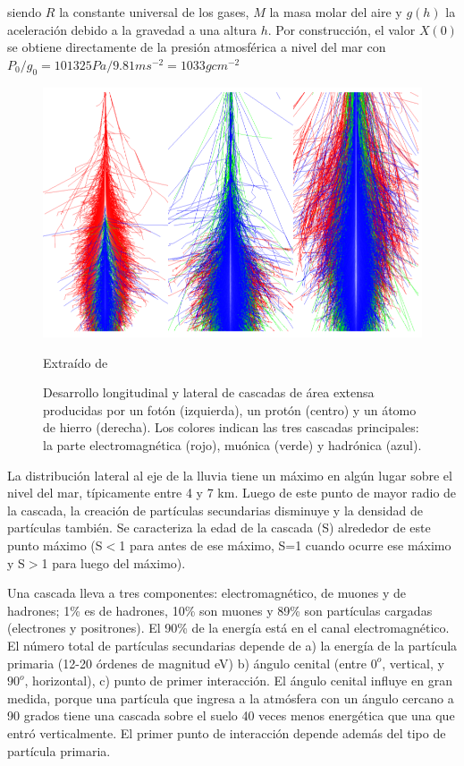 \documentclass{book}
\begin{document}
siendo $R$ la constante universal de los gases, $M$ la masa molar del aire y $g(h)$ la aceleraci\'on debido a la gravedad a una altura $h$. Por construcci\'on, el valor $X(0)$ se obtiene directamente de la presi\'on atmosf\'erica a nivel del mar con $P_0/g_0=101325Pa/9.81ms^{-2}=1033gcm^{-2}$ \citep{YUNIOR}

\begin{figure}[ht] %
\begin{center}
 \includegraphics[width = 0.7\linewidth]{Cascadas.png}
 
 Extra\'ido de \citep{ASOREY}
\caption{Desarrollo longitudinal y lateral de cascadas de \'area extensa producidas por un fot\'on (izquierda), un prot\'on (centro) y un \'atomo de hierro (derecha). Los colores indican las tres cascadas principales: la parte electromagn\'etica (rojo), mu\'onica (verde) y hadr\'onica (azul).}
\end{center}
\end{figure}

La distribuci\'on lateral al eje de la lluvia tiene un m\'aximo en alg\'un lugar sobre el nivel del mar, t\'ipicamente entre 4 y 7 km. Luego de este punto de mayor radio de la cascada, la creaci\'on de part\'iculas secundarias disminuye y la densidad de part\'iculas tambi\'en. Se caracteriza la edad de la cascada (S) alrededor de este punto m\'aximo (S$<$1 para antes de ese m\'aximo, S=1 cuando ocurre ese m\'aximo y S$>$1 para luego del m\'aximo). \citep{ASOREY}\citep{SUAREZ}

Una cascada lleva a tres componentes: electromagn\'etico, de muones y de hadrones; 1\% es de hadrones, 10\% son muones y 89\% son part\'iculas cargadas (electrones y positrones). El 90\% de la energ\'ia est\'a en el canal electromagn\'etico. El n\'umero total de part\'iculas secundarias depende de a) la energ\'ia de la part\'icula primaria (12-20 \'ordenes de magnitud eV) b) \'angulo cenital (entre $0^o$, vertical, y $90^o$, horizontal), c) punto de primer interacci\'on. El \'angulo cenital influye en gran medida, porque una part\'icula que ingresa a la atm\'osfera con un \'angulo cercano a 90 grados tiene una cascada sobre el suelo 40 veces menos energ\'etica que una que entr\'o verticalmente. El primer punto de interacci\'on depende adem\'as del tipo de part\'icula primaria. \citep{ASOREY}\citep{SUAREZ}
\end{document}
